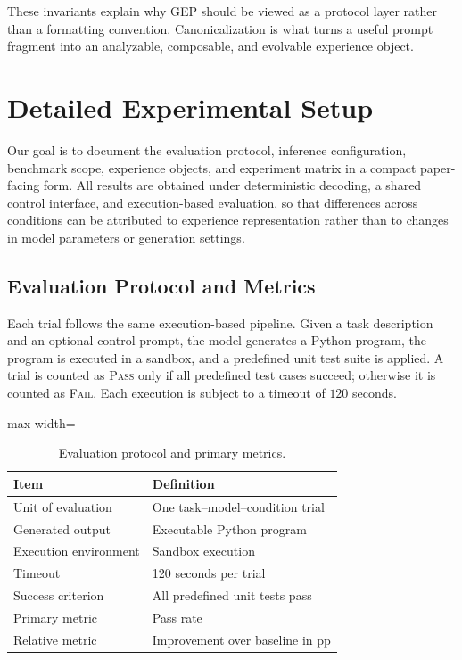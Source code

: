 \documentclass{article}
\begin{document}
These invariants explain why GEP should be viewed as a protocol layer rather than a formatting convention. 
Canonicalization is what turns a useful prompt fragment into an analyzable, composable, and evolvable experience object.

\section{Detailed Experimental Setup}
\label{app:exp_setup}

Our goal is to document the evaluation protocol, inference configuration, benchmark scope, experience objects, and experiment matrix in a compact paper-facing form. 
All results are obtained under deterministic decoding, a shared control interface, and execution-based evaluation, so that differences across conditions can be attributed to experience representation rather than to changes in model parameters or generation settings.

\subsection{Evaluation Protocol and Metrics}
\label{app:eval_metric}

Each trial follows the same execution-based pipeline. 
Given a task description and an optional control prompt, the model generates a Python program, the program is executed in a sandbox, and a predefined unit test suite is applied. 
A trial is counted as \textsc{Pass} only if all predefined test cases succeed; otherwise it is counted as \textsc{Fail}. 
Each execution is subject to a timeout of $120$ seconds.

\begin{table}[t]
\centering
\caption{Evaluation protocol and primary metrics.}
\label{tab:eval_protocol}
\begin{adjustbox}{max width=\columnwidth}
\begin{tabular}{ll}
\toprule
\textbf{Item} & \textbf{Definition} \\
\midrule
Unit of evaluation & One task--model--condition trial \\
Generated output & Executable Python program \\
Execution environment & Sandbox execution \\
Timeout & 120 seconds per trial \\
Success criterion & All predefined unit tests pass \\
Primary metric & Pass rate \\
Relative metric & Improvement over baseline in pp \\
\bottomrule
\end{tabular}
\end{adjustbox}
\end{table}
\end{document}
